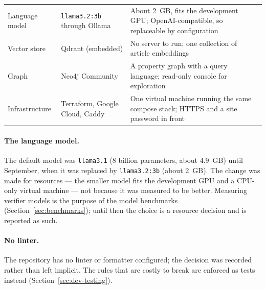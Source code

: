 \begin{table}[ht]
\begin{tabularx}{\linewidth}{@{}lXX@{}}
Language model & \texttt{llama3.2:3b} through Ollama & About 2~GB,
fits the development GPU; OpenAI-compatible, so replaceable by
configuration \\
Vector store & Qdrant (embedded) & No server to run; one collection of
article embeddings \\
Graph & Neo4j Community & A property graph with a query language;
read-only console for exploration \\
Infrastructure & Terraform, Google Cloud, Caddy & One virtual machine
running the same compose stack; HTTPS and a site password in front \\
\bottomrule
\end{tabularx}
\end{table}

\paragraph{The language model.} The default model was
\texttt{llama3.1} (8 billion parameters, about 4.9~GB) until September,
when it was replaced by \texttt{llama3.2:3b} (about 2~GB). The change
was made for resources --- the smaller model fits the development GPU
and a CPU-only virtual machine --- not because it was measured to be
better. Measuring verifier models is the purpose of the model
benchmarks (Section~\ref{sec:benchmarks}); until then the choice is a
resource decision and is reported as such.

\paragraph{No linter.} The repository has no linter or formatter
configured; the decision was recorded rather than left implicit. The
rules that are costly to break are enforced as tests instead
(Section~\ref{sec:dev-testing}).
